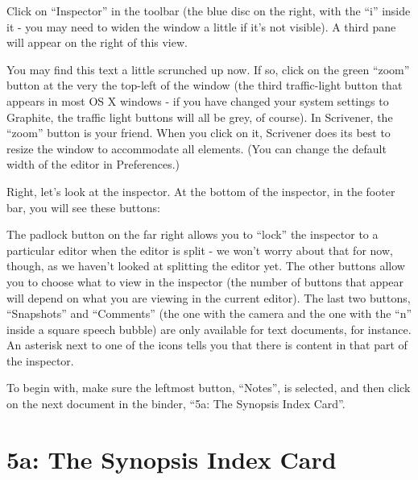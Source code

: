 \documentclass[10pt,oneside]{memoir}
\begin{document}
Click on ``Inspector'' in the toolbar (the blue disc on the right, with the ``i'' inside it - you may need to widen the window a little if it's not visible). A third pane will appear on the right of this view.


You may find this text a little scrunched up now. If so, click on the green ``zoom'' button at the very the top-left of the window (the third traffic-light button that appears in most OS X windows - if you have changed your system settings to Graphite, the traffic light buttons will all be grey, of course). In Scrivener, the ``zoom'' button is your friend. When you click on it, Scrivener does its best to resize the window to accommodate all elements. (You can change the default width of the editor in Preferences.)


Right, let's look at the inspector. At the bottom of the inspector, in the footer bar, you will see these buttons:


\begin{figure}
\begin{center}
\end{center}
\label{tutorial-step5_theinspector-1.png}
\end{figure}



The padlock button on the far right allows you to ``lock'' the inspector to a particular editor when the editor is split - we won't worry about that for now, though, as we haven't looked at splitting the editor yet. The other buttons allow you to choose what to view in the inspector (the number of buttons that appear will depend on what you are viewing in the current editor). The last two buttons, ``Snapshots'' and ``Comments'' (the one with the camera and the one with the ``n'' inside a square speech bubble) are only available for text documents, for instance. An asterisk next to one of the icons tells you that there is content in that part of the inspector.


To begin with, make sure the leftmost button, ``Notes'', is selected, and then click on the next document in the binder, ``5a: The Synopsis Index Card''.


\pagebreak \section{5a: The Synopsis Index Card}
\label{a:thesynopsisindexcard}
\end{document}
